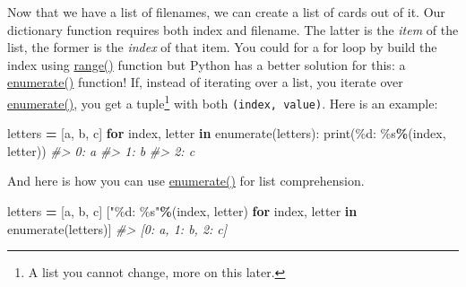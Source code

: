 \documentclass[
]{book}
\newenvironment{Shaded}{\begin{snugshade}}{\end{snugshade}}
\newcommand{\BuiltInTok}[1]{#1}
\newcommand{\CommentTok}[1]{\textcolor[rgb]{0.56,0.35,0.01}{\textit{#1}}}
\newcommand{\ControlFlowTok}[1]{\textcolor[rgb]{0.13,0.29,0.53}{\textbf{#1}}}
\newcommand{\KeywordTok}[1]{\textcolor[rgb]{0.13,0.29,0.53}{\textbf{#1}}}
\newcommand{\NormalTok}[1]{#1}
\newcommand{\OperatorTok}[1]{\textcolor[rgb]{0.81,0.36,0.00}{\textbf{#1}}}
\newcommand{\SpecialCharTok}[1]{\textcolor[rgb]{0.00,0.00,0.00}{#1}}
\newcommand{\StringTok}[1]{\textcolor[rgb]{0.31,0.60,0.02}{#1}}
\begin{document}
Now that we have a list of filenames, we can create a list of cards out of it. Our dictionary function requires both index and filename. The latter is the \emph{item} of the list, the former is the \emph{index} of that item. You could for a for loop by build the index using \protect\hyperlink{range}{range()} function but Python has a better solution for this: a \href{https://docs.python.org/3/library/functions.html\#enumerate}{enumerate()} function! If, instead of iterating over a list, you iterate over \href{https://docs.python.org/3/library/functions.html\#enumerate}{enumerate()}, you get a tuple\footnote{A list you cannot change, more on this later.} with both \texttt{(index,\ value)}. Here is an example:

\begin{Shaded}
\begin{Highlighting}[]
\NormalTok{letters }\OperatorTok{=}\NormalTok{ [}\StringTok{\textquotesingle{}a\textquotesingle{}}\NormalTok{, }\StringTok{\textquotesingle{}b\textquotesingle{}}\NormalTok{, }\StringTok{\textquotesingle{}c\textquotesingle{}}\NormalTok{]}
\ControlFlowTok{for}\NormalTok{ index, letter }\KeywordTok{in} \BuiltInTok{enumerate}\NormalTok{(letters):}
    \BuiltInTok{print}\NormalTok{(}\StringTok{\textquotesingle{}}\SpecialCharTok{\%d}\StringTok{: }\SpecialCharTok{\%s}\StringTok{\textquotesingle{}}\OperatorTok{\%}\NormalTok{(index, letter))}
\CommentTok{\#\textgreater{} 0: a}
\CommentTok{\#\textgreater{} 1: b}
\CommentTok{\#\textgreater{} 2: c}
\end{Highlighting}
\end{Shaded}

And here is how you can use \href{https://docs.python.org/3/library/functions.html\#enumerate}{enumerate()} for list comprehension.

\begin{Shaded}
\begin{Highlighting}[]
\NormalTok{letters }\OperatorTok{=}\NormalTok{ [}\StringTok{\textquotesingle{}a\textquotesingle{}}\NormalTok{, }\StringTok{\textquotesingle{}b\textquotesingle{}}\NormalTok{, }\StringTok{\textquotesingle{}c\textquotesingle{}}\NormalTok{]}
\NormalTok{[}\StringTok{"}\SpecialCharTok{\%d}\StringTok{: }\SpecialCharTok{\%s}\StringTok{"}\OperatorTok{\%}\NormalTok{(index, letter) }\ControlFlowTok{for}\NormalTok{ index, letter }\KeywordTok{in} \BuiltInTok{enumerate}\NormalTok{(letters)]}
\CommentTok{\#\textgreater{} [\textquotesingle{}0: a\textquotesingle{}, \textquotesingle{}1: b\textquotesingle{}, \textquotesingle{}2: c\textquotesingle{}]}
\end{Highlighting}
\end{Shaded}
\end{document}
